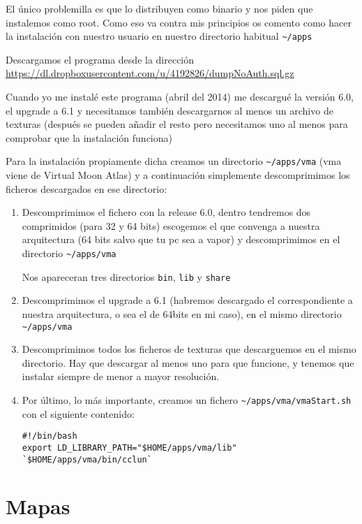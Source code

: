 El único problemilla es que lo distribuyen como binario y nos piden que
instalemos como root. Como eso va contra mis principios os comento como
hacer la instalación con nuestro usuario en nuestro directorio habitual
\texttt{\textasciitilde{}/apps}

Descargamos el programa desde la dirección
\url{https://dl.dropboxusercontent.com/u/4192826/dumpNoAuth.sql.gz}

Cuando yo me instalé este programa (abril del 2014) me descargué la
versión 6.0, el upgrade a 6.1 y necesitamos también descargarnos al
menos un archivo de texturas (después se pueden añadir el resto pero
necesitamos uno al menos para comprobar que la instalación funciona)

Para la instalación propiamente dicha creamos un directorio
\texttt{\textasciitilde{}/apps/vma} (vma viene de Virtual Moon Atlas) y
a continuación simplemente descomprimimos los ficheros descargados en
ese directorio:

\begin{enumerate}
\def\labelenumi{\arabic{enumi}.}
\item
  Descomprimimos el fichero con la release 6.0, dentro tendremos dos
  comprimidos (para 32 y 64 bits) escogemos el que convenga a nuestra
  arquitectura (64 bits salvo que tu pc sea a vapor) y descomprimimos en
  el directorio \texttt{\textasciitilde{}/apps/vma}

  Nos apareceran tres directorios \texttt{bin}, \texttt{lib} y
  \texttt{share}
\item
  Descomprimimos el upgrade a 6.1 (habremos descargado el
  correspondiente a nuestra arquitectura, o sea el de 64bits en mi
  caso), en el mismo directorio \texttt{\textasciitilde{}/apps/vma}
\item
  Descomprimimos todos los ficheros de texturas que descarguemos en el
  mismo directorio. Hay que descargar al menos uno para que funcione, y
  tenemos que instalar siempre de menor a mayor resolución.
\item
  Por último, lo más importante, creamos un fichero
  \texttt{\textasciitilde{}/apps/vma/vmaStart.sh} con el siguiente
  contenido:

\begin{verbatim}
#!/bin/bash
export LD_LIBRARY_PATH="$HOME/apps/vma/lib"
`$HOME/apps/vma/bin/cclun`
\end{verbatim}
\end{enumerate}

\section{Mapas}\label{mapas}

